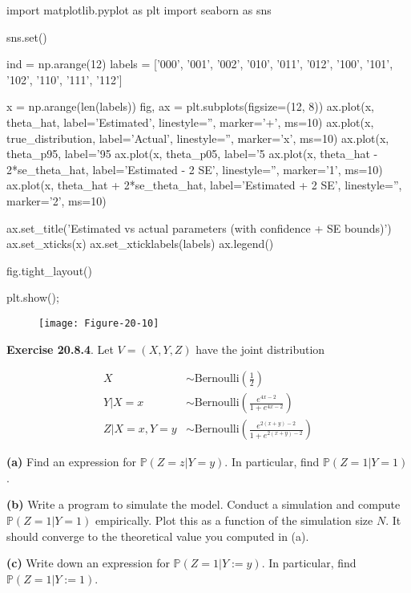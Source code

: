 \begin{python}
import matplotlib.pyplot as plt
import seaborn as sns

sns.set()

ind = np.arange(12)
labels = ['000', '001', '002', '010', '011', '012', '100', '101', '102', '110', '111', '112']

x = np.arange(len(labels))
fig, ax = plt.subplots(figsize=(12, 8))
ax.plot(x, theta_hat, label='Estimated', linestyle='', marker='+', ms=10)
ax.plot(x, true_distribution, label='Actual', linestyle='', marker='x', ms=10)
ax.plot(x, theta_p95, label='95%
ax.plot(x, theta_p05, label='5%
ax.plot(x, theta_hat - 2*se_theta_hat, label='Estimated - 2 SE', linestyle='', marker='1', ms=10)
ax.plot(x, theta_hat + 2*se_theta_hat, label='Estimated + 2 SE', linestyle='', marker='2', ms=10)

ax.set_title('Estimated vs actual parameters (with confidence + SE bounds)')
ax.set_xticks(x)
ax.set_xticklabels(labels)
ax.legend()

fig.tight_layout()

plt.show();
\end{python}

\begin{figure}[H]
\centering
\texttt{[image: Figure-20-10]}
\end{figure}

\textbf{Exercise 20.8.4}. Let \(V = (X, Y, Z)\) have the joint
distribution

\begin{align*}
X &\sim \text{Bernoulli}\left(\frac{1}{2}\right) \\
Y | X = x &\sim \text{Bernoulli}\left(\frac{e^{4x - 2}}{1 + e^{4x - 2}}\right) \\
Z | X = x, Y = y &\sim \text{Bernoulli}\left(\frac{e^{2(x+y)-2}}{1 + e^{2(x+y)-2}}\right)
\end{align*}

\textbf{(a)} Find an expression for \(\mathbb{P}(Z = z | Y = y)\). In
particular, find \(\mathbb{P}(Z = 1 | Y = 1)\).

\textbf{(b)} Write a program to simulate the model. Conduct a simulation
and compute \(\mathbb{P}(Z = 1 | Y = 1)\) empirically. Plot this as a
function of the simulation size \(N\). It should converge to the
theoretical value you computed in (a).

\textbf{(c)} Write down an expression for
\(\mathbb{P}(Z = 1 | Y := y)\). In particular, find
\(\mathbb{P}(Z = 1 | Y := 1)\).

